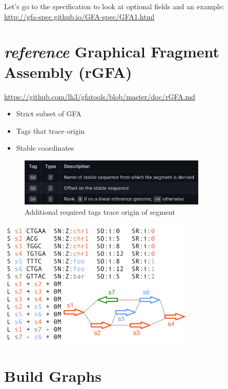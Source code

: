 \documentclass[
]{book}
\providecommand{\tightlist}{%
  \setlength{\itemsep}{0pt}\setlength{\parskip}{0pt}}
\begin{document}
Let's go to the specification to look at optional fields and an example:\\
\url{http://gfa-spec.github.io/GFA-spec/GFA1.html}

\hypertarget{reference-graphical-fragment-assembly-rgfa}{%
\section{\texorpdfstring{\emph{reference} Graphical Fragment Assembly (rGFA)}{reference Graphical Fragment Assembly (rGFA)}}\label{reference-graphical-fragment-assembly-rgfa}}

\url{https://github.com/lh3/gfatools/blob/master/doc/rGFA.md}

\begin{itemize}
\tightlist
\item
  Strict subset of GFA
\item
  Tags that trace origin
\item
  Stable coordinates
\end{itemize}

\begin{figure}
\centering
\includegraphics[width=0.8\textwidth,height=\textheight]{./Figures/rGFA1.png}
\caption{Additional required tags trace origin of segment}
\end{figure}

\includegraphics[width=0.7\textwidth,height=\textheight]{./Figures/rGFA2.png}

\hypertarget{build-graphs}{%
\section{Build Graphs}\label{build-graphs}}
\end{document}
